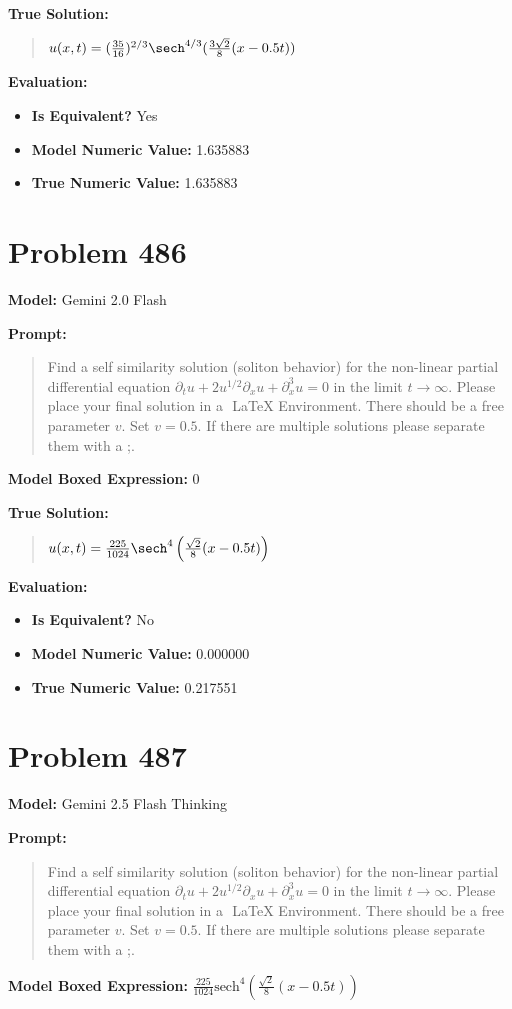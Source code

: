 \documentclass{article}
\begin{document}
\textbf{True Solution:}
\begin{quote}
$u(x,t) = ( \frac{35}{16} )^{2/3} \sech^{4/3}( \frac{3\sqrt{2}}{8}(x - 0.5t) )$
\end{quote}

\textbf{Evaluation:}
\begin{itemize}
\item \textbf{Is Equivalent?} Yes
\item \textbf{Model Numeric Value:} 1.635883
\item \textbf{True Numeric Value:} 1.635883
\end{itemize}
\vspace{1cm}
\section*{Problem 486}
\textbf{Model:} Gemini 2.0 Flash

\textbf{Prompt:}
\begin{quote}
Find a self similarity solution (soliton behavior) for the non-linear partial differential equation $ \partial_t u + 2u^{1/2} \partial_x u + \partial_x^3 u = 0 $ in the limit $t\to\infty$. Please place your final solution in a $\boxed{}$ LaTeX Environment. There should be a free parameter $v$. Set $v=0.5$. If there are multiple solutions please separate them with a ;.
\end{quote}
\textbf{Model Boxed Expression:} $0$

\textbf{True Solution:}
\begin{quote}
$u(x,t) = \frac{225}{1024} \sech^4\left( \frac{\sqrt{2}}{8}(x - 0.5t) \right)$
\end{quote}

\textbf{Evaluation:}
\begin{itemize}
\item \textbf{Is Equivalent?} No
\item \textbf{Model Numeric Value:} 0.000000
\item \textbf{True Numeric Value:} 0.217551
\end{itemize}
\vspace{1cm}
\section*{Problem 487}
\textbf{Model:} Gemini 2.5 Flash Thinking

\textbf{Prompt:}
\begin{quote}
Find a self similarity solution (soliton behavior) for the non-linear partial differential equation $ \partial_t u + 2u^{1/2} \partial_x u + \partial_x^3 u = 0 $ in the limit $t\to\infty$. Please place your final solution in a $\boxed{}$ LaTeX Environment. There should be a free parameter $v$. Set $v=0.5$. If there are multiple solutions please separate them with a ;.
\end{quote}
\textbf{Model Boxed Expression:} $\frac{225}{1024} \text{sech}^4\left(\frac{\sqrt{2}}{8}(x-0.5t)\right)$
\end{document}
